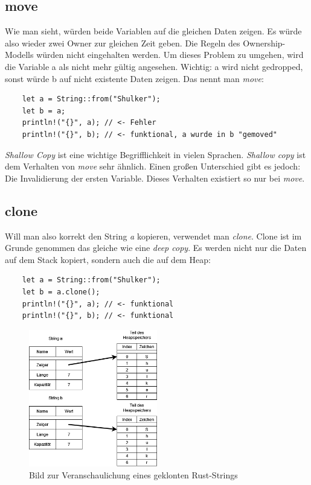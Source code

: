 \subsection{move}
Wie man sieht, würden beide Variablen auf die gleichen Daten zeigen. Es würde also wieder zwei Owner zur gleichen Zeit geben. Die Regeln des Ownership-Modells würden
nicht eingehalten werden. Um dieses Problem zu umgehen, wird die Variable a als nicht mehr gültig angesehen. Wichtig: a wird nicht gedropped, sonst
würde b auf nicht existente Daten zeigen. Das nennt man \textit{move}:
\begin{lstlisting}
    let a = String::from("Shulker");
    let b = a;
    println!("{}", a); // <- Fehler
    println!("{}", b); // <- funktional, a wurde in b "gemoved"
\end{lstlisting}
\textit{Shallow Copy} ist eine wichtige Begrifflichkeit in vielen Sprachen. \textit{Shallow copy} ist dem Verhalten von \textit{move} sehr ähnlich. Einen
großen Unterschied gibt es jedoch: Die Invalidierung der ersten Variable. Dieses Verhalten existiert so nur bei \textit{move}.

\subsection{clone}
Will man also korrekt den String \textit{a} kopieren, verwendet man \textit{clone}. Clone ist im Grunde genommen das gleiche wie eine \textit{deep copy}.
Es werden nicht nur die Daten auf dem Stack kopiert, sondern auch die auf dem Heap:
\begin{lstlisting}
    let a = String::from("Shulker");
    let b = a.clone();
    println!("{}", a); // <- funktional
    println!("{}", b); // <- funktional
\end{lstlisting}
\begin{figure}[H]
    \begin{center}
        \includegraphics[width=0.5\textwidth]{images/rust/string_clone_repr.png}
        \caption{Bild zur Veranschaulichung eines geklonten Rust-Strings}
    \end{center}
\end{figure}

